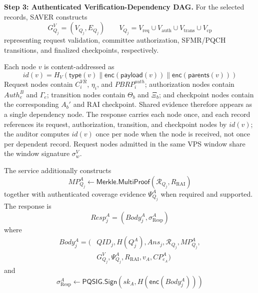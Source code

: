 \documentclass[lettersize,journal]{IEEEtran}
\begin{document}
\medskip
\noindent\textbf{Step 3: Authenticated Verification-Dependency DAG.}
For the selected records, SAVER constructs
\begin{equation}
G_{Q_j}^{V}=(V_{Q_j},E_{Q_j})
\qquad
V_{Q_j}
=
V_{\mathrm{req}}\cup V_{\mathrm{auth}}
\cup V_{\mathrm{trans}}\cup V_{\mathrm{cp}}
\end{equation}
representing request validation, committee authorization, SFMR/PQCH
transitions, and finalized checkpoints, respectively.

Each node $v$ is content-addressed as
\begin{equation}
id(v)=
H_V(
\mathsf{type}(v)\parallel
\mathsf{enc}(\mathsf{payload}(v))\parallel
\mathsf{enc}(\mathsf{parents}(v)))
\label{eq:node_id}
\end{equation}
Request nodes contain $C_i^{VR}$, $\eta_i$, and
$PBRP_i^{auth}$; authorization nodes contain $Auth_e^B$ and
$\Gamma_e$; transition nodes contain $\Theta_b$ and $\Xi_b$; and
checkpoint nodes contain the corresponding $A_b'$ and RAI checkpoint.
Shared evidence therefore appears as a single dependency node.
The response carries each node once, and each record
references its request, authorization, transition, and checkpoint nodes
by $id(v)$; the auditor computes $id(v)$ once per node when the node is
received, not once per dependent record. Request nodes admitted in the
same VPS window share the window signature $\sigma_w^{V}$.

The service additionally constructs
\begin{equation}
MP_{Q_j}^A
\leftarrow
\mathsf{Merkle.MultiProof}
(\mathcal{R}_{Q_j},R_{\mathrm{RAI}})
\end{equation}
together with authenticated coverage evidence $\Psi_{Q_j}^A$ when
required and supported. The response is
\begin{equation}
Resp_j^A=(Body_j^A,\sigma_{\mathrm{Resp}}^A)
\end{equation}
where
\begin{equation}
\begin{aligned}
Body_j^A=\big(
&QID_j,H(Q_j^A),Ans_j,\mathcal{R}_{Q_j},MP_{Q_j}^A,\\
&G_{Q_j}^{V},\Psi_{Q_j}^{A},
R_{\mathrm{RAI}},v_A,CP_{e_A}^A\big)
\end{aligned}
\end{equation}
and
\begin{equation}
\sigma_{\mathrm{Resp}}^A
\leftarrow
\mathsf{PQSIG.Sign}
(sk_A,H(\mathsf{enc}(Body_j^A)))
\end{equation}
\end{document}
